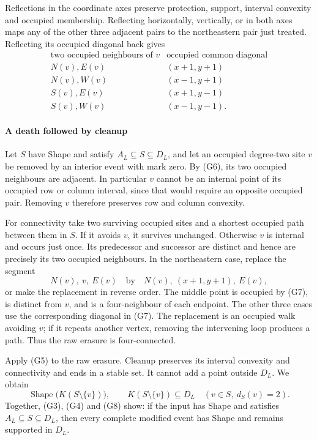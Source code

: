 \documentclass[
  11pt,
  a4paper,
]{article}
\begin{document}
Reflections in the coordinate axes preserve protection, support,
interval convexity and occupied membership. Reflecting horizontally,
vertically, or in both axes maps any of the other three adjacent pairs
to the northeastern pair just treated. Reflecting its occupied diagonal
back gives \[
\begin{array}{c|c}
\text{two occupied neighbours of }v&\text{occupied common diagonal}\\ \hline
N(v),E(v)&(x+1,y+1)\\
N(v),W(v)&(x-1,y+1)\\
S(v),E(v)&(x+1,y-1)\\
S(v),W(v)&(x-1,y-1).
\end{array}
\tag{G7}
\]

\paragraph{A death followed by
cleanup}\label{a-death-followed-by-cleanup}

Let \(S\) have Shape and satisfy \(A_L\subseteq S\subseteq D_L\), and
let an occupied degree-two site \(v\) be removed by an interior event
with mark zero. By (G6), its two occupied neighbours are adjacent. In
particular \(v\) cannot be an internal point of its occupied row or
column interval, since that would require an opposite occupied pair.
Removing \(v\) therefore preserves row and column convexity.

For connectivity take two surviving occupied sites and a shortest
occupied path between them in \(S\). If it avoids \(v\), it survives
unchanged. Otherwise \(v\) is internal and occurs just once. Its
predecessor and successor are distinct and hence are precisely its two
occupied neighbours. In the northeastern case, replace the segment \[
N(v),\ v,\ E(v)
\quad\text{by}\quad
N(v),\ (x+1,y+1),\ E(v),
\] or make the replacement in reverse order. The middle point is
occupied by (G7), is distinct from \(v\), and is a four-neighbour of
each endpoint. The other three cases use the corresponding diagonal in
(G7). The replacement is an occupied walk avoiding \(v\); if it repeats
another vertex, removing the intervening loop produces a path. Thus the
raw erasure is four-connected.

Apply (G5) to the raw erasure. Cleanup preserves its interval convexity
and connectivity and ends in a stable set. It cannot add a point outside
\(D_L\). We obtain \[
\operatorname{Shape}\bigl(K(S\setminus\{v\})\bigr),\qquad
K(S\setminus\{v\})\subseteq D_L
\quad(v\in S,\ d_S(v)=2).
\tag{G8}
\] Together, (G3), (G4) and (G8) show: if the input has Shape and
satisfies \(A_L\subseteq S\subseteq D_L\), then every complete modified
event has Shape and remains supported in \(D_L\).
\end{document}

